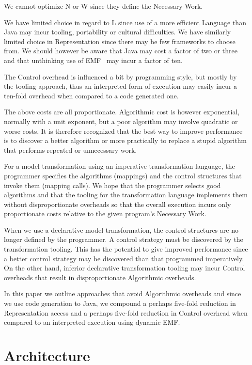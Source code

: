 \documentclass{llncs}
\begin{document}
We cannot optimize N or W since they define the Necessary Work.

We have limited choice in regard to L since use of a more efficient Language than Java may incur tooling, portability or cultural difficulties. We have similarly limited choice in Representation since there may be few frameworks to choose from. We should however be aware that Java may cost a factor of two or three and that unthinking use of EMF~\cite{Eclipse-EMF} may incur a factor of ten.

The Control overhead is influenced a bit by programming style, but mostly by the tooling approach, thus an interpreted form of execution may easily incur a ten-fold overhead when compared to a code generated one.

The above costs are all proportionate. Algorithmic cost is however exponential, normally with a unit exponent, but a poor algorithm may involve quadratic or worse costs. It is therefore recognized that the best way to improve performance is to discover a better algorithm or more practically to replace a stupid algorithm that performs repeated or unnecessary work.

For a  model transformation using an imperative transformation language, the programmer specifies the algorithms (mappings) and the control structures that invoke them (mapping calls). We hope that the programmer selects good algorithms and that the tooling for the transformation language implements them without disproportionate overheads so that the overall execution incurs only proportionate costs relative to the given program's Necessary Work.

When we use a declarative model transformation, the control structures are no longer defined by the programmer. A control strategy must be discovered by the transformation tooling. This has the potential to give improved performance since a better control strategy may be discovered than that programmed imperatively. On the other hand, inferior declarative transformation tooling may incur Control overheads that result in disproportionate Algorithmic overheads.

In this paper we outline approaches that avoid Algorithmic overheads and since we use code generation to Java, we compound a perhaps five-fold reduction in Representation access and a perhaps five-fold reduction in Control overhead when compared to an interpreted execution using dynamic EMF.

\section{Architecture}\label{Architecture}
\end{document}
